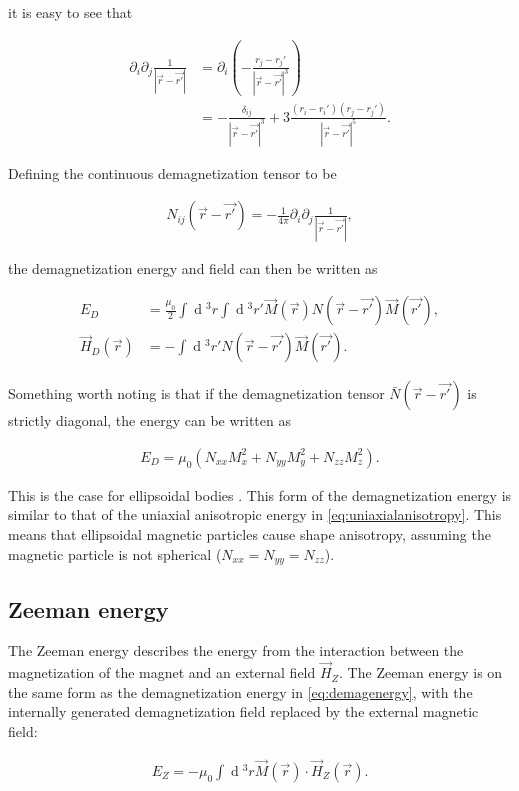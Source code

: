 \documentclass[1p]{elsarticle}		%
\renewcommand{\d}[1]{\ensuremath{\operatorname{d}\!{#1}}}
\begin{document}
it is easy to see that

\begin{align*}
\partial_i\partial_j \frac{1}{|\vec{r}-\vec{r'}|} &= \partial_i(-\frac{r_j-r_j'}{|\vec{r}-\vec{r'}|^3}) \\
&= -\frac{\delta_{ij}}{|\vec{r}-\vec{r'}|^3}+3\frac{(r_i-r_i')(r_j-r_j')}{|\vec{r}-\vec{r'}|^5}.
\end{align*}

Defining the continuous demagnetization tensor to be

\begin{align}
N_{ij}(\vec{r}-\vec{r'}) = -\frac{1}{4\pi}\partial_i\partial_j \frac{1}{|\vec{r}-\vec{r'}|},
\end{align}

the demagnetization energy and field can then be written as

\begin{align}
E_D &= \frac{\mu_0}{2} \int \d {^3}r \int \d {^3}r' \vec{M}(\vec{r}) N(\vec{r}-\vec{r'})\vec{M}(\vec{r'}), \\
\vec{H}_D(\vec{r}) &= - \int \d {^3}r' N(\vec{r}-\vec{r'})\vec{M}(\vec{r'}).
\end{align}

Something worth noting is that if the demagnetization tensor $\bar{N}(\vec{r}-\vec{r'})$ is strictly diagonal, the energy can be written as

\begin{align}
E_D = \mu_0(N_{xx}M_x^2+N_{yy}M_y^2+N_{zz}M_z^2).
\end{align}

This is the case for ellipsoidal bodies \cite{kruger2006current}. This form of the demagnetization energy is similar to that of the uniaxial anisotropic energy in \eqref{eq:uniaxialanisotropy}. This means that ellipsoidal magnetic particles cause shape anisotropy, assuming the magnetic particle is not spherical ($N_{xx} = N_{yy} = N_{zz}$).

\subsection{Zeeman energy}
The Zeeman energy describes the energy from the interaction between the magnetization of the magnet and an external field $\vec{H}_{Z}$. The Zeeman energy is on the same form as the demagnetization energy in \eqref{eq:demagenergy}, with the internally generated demagnetization field replaced by the external magnetic field:

\begin{align}
\label{eq:zeemanenergy}
E_Z = -\mu_0\int \d {^3}r \vec{M}(\vec{r})\cdot\vec{H}_{Z}(\vec{r}).
\end{align}
\end{document}
